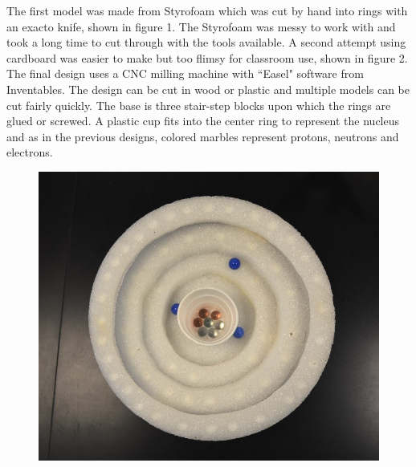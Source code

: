 \documentclass[11pt]{sig-alternate}
\begin{document}
\begin{large}
The first model was made from Styrofoam which was cut by hand into rings with an exacto knife, shown in figure 1. The Styrofoam was messy to work with and took a long time to cut through with the tools available. A second attempt using cardboard was easier to make but too flimsy for classroom use, shown in figure 2. The final design uses a CNC milling machine with ``Easel" software from Inventables. The design can be cut in wood or plastic and multiple models can be cut fairly quickly. The base is three stair-step blocks upon which the rings are glued or screwed. A plastic cup fits into the center ring to represent the nucleus and as in the previous designs, colored marbles represent protons, neutrons and electrons.

\begin{figure}[t]
    \centering
    \includegraphics[width=\columnwidth]{figure 1_1.jpg}
\end{figure}


\end{large}
\end{document}
